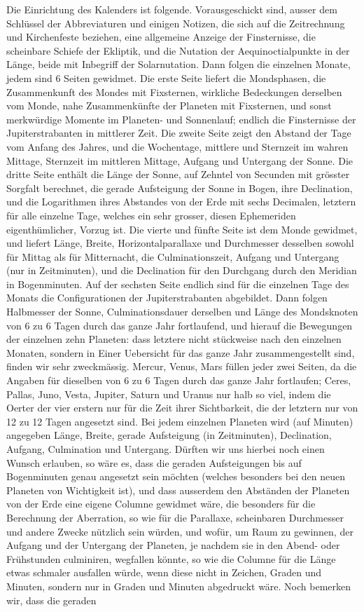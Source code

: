 Die Einrichtung des Kalenders ist folgende. Vorausgeschickt sind, ausser dem Schlüssel der Abbreviaturen und einigen Notizen, die sich auf die Zeitrechnung und Kirchenfeste beziehen, eine allgemeine Anzeige der Finsternisse, die scheinbare Schiefe der Ekliptik, und die Nutation der Aequinoctialpunkte in der Länge, beide mit Inbegriff der Solarnutation. Dann folgen die einzelnen Monate, jedem sind 6 Seiten gewidmet. Die erste Seite liefert die Mondsphasen, die Zusammenkunft des Mondes mit Fixsternen, wirkliche Bedeckungen derselben vom Monde, nahe Zusammenkünfte der Planeten mit Fixsternen, und sonst merkwürdige Momente im Planeten- und Sonnenlauf; endlich die Finsternisse der Jupiterstrabanten in mittlerer Zeit. Die zweite Seite zeigt den Abstand der Tage vom Anfang des Jahres, und die Wochentage, mittlere und Sternzeit im wahren Mittage, Sternzeit im mittleren Mittage, Aufgang und Untergang der Sonne. Die dritte Seite enthält die Länge der Sonne, auf Zehntel von Secunden mit grösster Sorgfalt berechnet, die gerade Aufsteigung der Sonne in Bogen, ihre Declination, und die Logarithmen ihres Abstandes von der Erde mit sechs Decimalen, letztern für alle einzelne Tage, welches ein sehr grosser, diesen Ephemeriden eigenthümlicher, Vorzug ist. Die vierte und fünfte Seite ist dem Monde gewidmet, und liefert Länge, Breite, Horizontalparallaxe und Durchmesser desselben sowohl für Mittag als für Mitternacht, die Culminationszeit, Aufgang und Untergang (nur in Zeitminuten), und die Declination für den Durchgang durch den Meridian in Bogenminuten. Auf der sechsten Seite endlich sind für die einzelnen Tage des Monats die Configurationen der Jupiterstrabanten abgebildet. Dann folgen Halbmesser der Sonne, Culminationsdauer derselben und Länge des Mondsknoten von 6 zu 6 Tagen durch das ganze Jahr fortlaufend, und hierauf die Bewegungen der einzelnen zehn Planeten: dass letztere nicht stückweise nach den einzelnen Monaten, sondern in Einer Uebersicht für das ganze Jahr zusammengestellt sind, finden wir sehr zweckmässig. Mercur, Venus, Mars füllen jeder zwei Seiten, da die Angaben für dieselben von 6 zu 6 Tagen durch das ganze Jahr fortlaufen; Ceres, Pallas, Juno, Vesta, Jupiter, Saturn und Uranus nur halb so viel, indem die Oerter der vier erstern nur für die Zeit ihrer Sichtbarkeit, die der letztern nur von 12 zu 12 Tagen angesetzt sind. Bei jedem einzelnen Planeten wird (auf Minuten) angegeben Länge, Breite, gerade Aufsteigung (in Zeitminuten), Declination, Aufgang, Culmination und Untergang. Dürften wir uns hierbei noch einen Wunsch erlauben, so wäre es, dass die geraden Aufsteigungen bis auf Bogenminuten genau angesetzt sein möchten (welches besonders bei den neuen Planeten von Wichtigkeit ist), und dass ausserdem den Abständen der Planeten von der Erde eine eigene Columne gewidmet wäre, die besonders für die Berechnung der Aberration, so wie für die Parallaxe, scheinbaren Durchmesser und andere Zwecke nützlich sein würden, und wofür, um Raum zu gewinnen, der Aufgang und der Untergang der Planeten, je nachdem sie in den Abend- oder Frühstunden culminiren, wegfallen könnte, so wie die Columne für die Länge etwas schmaler ausfallen würde, wenn diese nicht in Zeichen, Graden und Minuten, sondern nur in Graden und Minuten abgedruckt wäre. Noch bemerken wir, dass die geraden 